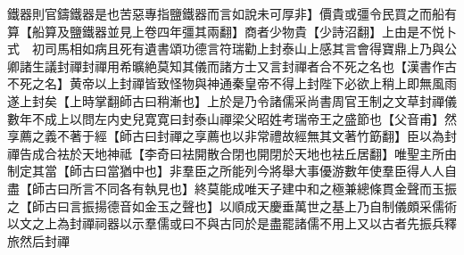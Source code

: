 鐵器則官鑄鐵器是也苦惡專指鹽鐵器而言如說未可厚非】價貴或彊令民買之而船有算【船算及鹽鐵器並見上卷四年彊其兩翻】商者少物貴【少詩沼翻】上由是不悦卜式　初司馬相如病且死有遺書頌功德言符瑞勸上封泰山上感其言會得寶鼎上乃與公卿諸生議封禪封禪用希曠絶莫知其儀而諸方士又言封禪者合不死之名也【漢書作古不死之名】黄帝以上封禪皆致怪物與神通秦皇帝不得上封陛下必欲上稍上即無風雨遂上封矣【上時掌翻師古曰稍漸也】上於是乃令諸儒采尚書周官王制之文草封禪儀數年不成上以問左内史兒寛寛曰封泰山禪梁父昭姓考瑞帝王之盛節也【父音甫】然享薦之義不著于經【師古曰封禪之享薦也以非常禮故經無其文著竹筯翻】臣以為封禪告成合袪於天地神祗【李奇曰袪開散合閉也開閉於天地也袪丘居翻】唯聖主所由制定其當【師古曰當猶中也】非羣臣之所能列今將舉大事優游數年使羣臣得人人自盡【師古曰所言不同各有執見也】終莫能成唯天子建中和之極兼總條貫金聲而玉振之【師古曰言振揚德音如金玉之聲也】以順成天慶垂萬世之基上乃自制儀頗采儒術以文之上為封禪祠器以示羣儒或曰不與古同於是盡罷諸儒不用上又以古者先振兵釋旅然后封禪

